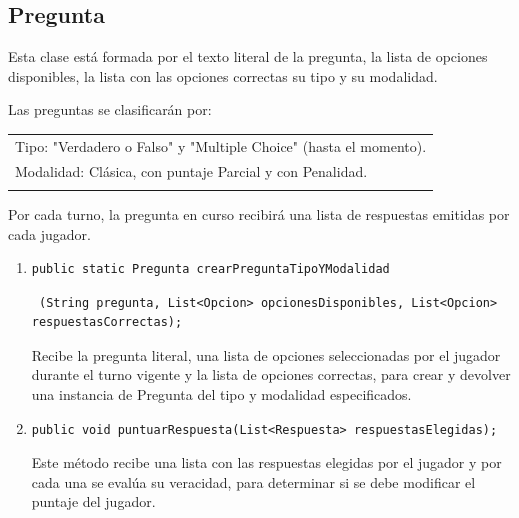 \documentclass[titlepage,a4paper]{article}
\begin{document}
\subsection{Pregunta}
Esta clase está formada por el texto literal de la pregunta, la lista de opciones disponibles, la lista con las opciones correctas su tipo y su modalidad.

Las preguntas se clasificarán por:\\

\begin{tabular}{l}
Tipo: "Verdadero o Falso"$ $ y "Multiple Choice" $ $(hasta el momento).\\
Modalidad: Clásica, con puntaje Parcial y con Penalidad.\\\\
\end{tabular}

Por cada turno, la pregunta en curso recibirá una lista de respuestas emitidas por cada jugador. \\

\begin{enumerate}
\item \begin{verbatim}public static Pregunta crearPreguntaTipoYModalidad\end{verbatim} \begin{verbatim} (String pregunta, List<Opcion> opcionesDisponibles, List<Opcion> respuestasCorrectas);\end{verbatim}
 Recibe la pregunta literal, una lista de opciones seleccionadas por el jugador durante el turno vigente y la lista de opciones correctas, para crear y devolver una instancia de Pregunta del tipo y modalidad especificados.
\item \begin{verbatim}
public void puntuarRespuesta(List<Respuesta> respuestasElegidas);\end{verbatim}
Este método recibe una lista con las respuestas elegidas por el jugador y por cada una se evalúa su veracidad, para determinar si se debe modificar el puntaje del jugador.
\end{enumerate}
\end{document}
